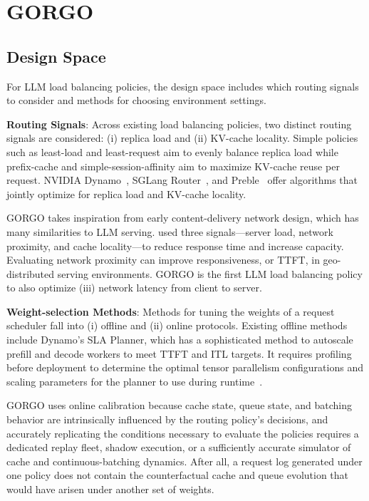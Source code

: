 \documentclass{article}
\begin{document}
\section{GORGO}
\label{sec:method}

\subsection{Design Space}

For LLM load balancing policies, the design space includes which routing signals to consider and methods for choosing environment settings.
 
\textbf{Routing Signals}: Across existing load balancing policies, two distinct routing signals are considered: (i) replica load and (ii) KV-cache locality.
Simple policies such as least-load and least-request aim to evenly balance replica load while prefix-cache and simple-session-affinity aim to maximize KV-cache reuse per request.
NVIDIA Dynamo~\citep{nvidiaDynamoRouter}, SGLang Router~\citep{sglang2024}, and Preble~\citep{preble} offer algorithms that jointly optimize for replica load and KV-cache locality.

GORGO takes inspiration from early content-delivery network design, which has many similarities to LLM serving.
\citet{wang2002cdn} used three signals---server load, network proximity, and cache locality---to reduce response time and increase capacity. Evaluating network proximity can improve
responsiveness, or TTFT, in geo-distributed serving environments. GORGO is the first LLM load balancing policy to also optimize (iii) network latency from client to server.

\textbf{Weight-selection Methods}: Methods for tuning the weights of a request scheduler fall into (i) offline and (ii) online protocols.
Existing offline methods include Dynamo's SLA Planner, which has a sophisticated method to autoscale prefill and decode workers to meet TTFT and ITL targets. 
It requires profiling before deployment to determine the optimal tensor parallelism configurations and scaling parameters for the planner to use during runtime~\citep{nvidiaDynamoPlanner}.

GORGO uses online calibration because cache state, queue state, and batching behavior are intrinsically influenced by the routing policy's decisions, and accurately replicating the conditions necessary to evaluate the policies requires a dedicated replay fleet, shadow execution, or a sufficiently accurate simulator of cache and continuous-batching dynamics.
After all, a request log generated under one policy does not contain the counterfactual cache and queue evolution that would have arisen under another set of weights.
\end{document}
